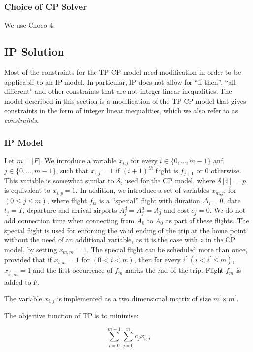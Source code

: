 \documentclass{mpaper}
\begin{document}
\subsubsection{Choice of CP Solver}
We use Choco 4.

\subsection{IP Solution}
Most of the constraints for the TP CP model need modification in order to be applicable to an IP model. In particular, IP does not allow for ``if-then'', ``all-different'' and other constraints that are not integer linear inequalities. The model described in this section is a modification of the TP CP model that gives constraints in the form of integer linear inequalities, which we also refer to as \textit{constraints}.

\subsubsection{IP Model}
Let $m = |F|$. We introduce a variable $x_{i,j}$ for every $i \in \{0,...,m-1\}$ and  $j \in \{0,...,m-1\}$, such that $x_{i,j} = 1$ if $(i+1)^{th}$ flight is $f_{j+1}$ or 0 otherwise. This variable is somewhat similar to $\mathcal{S}$, used for the CP model, where $\mathcal{S}[i] = p$ is equivalent to $x_{i,p} = 1$. In addition, we introduce a set of variables $x_{m,j}$, for $(0 \leq j \leq m)$, where flight $f_{m}$ is a ``special'' flight with duration $\Delta_{j} = 0$, date $t_{j} = T$, departure and arrival airports $A^{d}_{j} = A^{a}_{j} = A_{0}$ and cost $c_{j} = 0$. We do not add connection time when connecting from $A_{0}$ to $A_{0}$ as part of these flights. The special flight is used for enforcing the valid ending of the trip at the home point without the need of an additional variable, as it is the case with $z$ in the CP model, by setting $x_{m,m} = 1$. The special flight can be scheduled more than once, provided that if $x_{i,m} = 1$ for $(0 < i < m)$, then for every $i^\prime$ $(i < i^\prime \leq m)$, $x_{i^\prime,m} = 1$ and the first occurrence of $f_m$ marks the end of the trip. Flight $f_{m}$ is added to $F$.

The variable $x_{i,j}$ is implemented as a two dimensional matrix of size $m^\prime \times m^\prime$.

The objective function of TP is to minimise:

\begin{equation}
\label{eq:TPwithIPobj}
\sum^{m-1}_{i=0} \sum^{m}_{j=0} c_{j} x_{i,j}
\end{equation}
\end{document}
